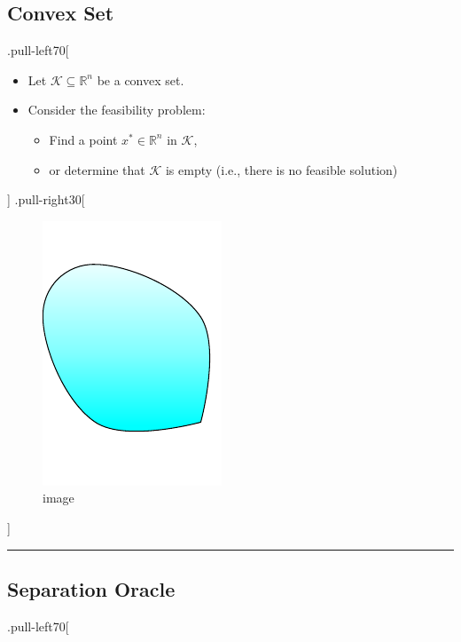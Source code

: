 \documentclass[
]{article}
\providecommand{\tightlist}{%
  \setlength{\itemsep}{0pt}\setlength{\parskip}{0pt}}
\begin{document}
\subsection{Convex Set}\label{convex-set}

.pull-left70{[}

\begin{itemize}
\tightlist
\item
  Let \(\mathcal{K} \subseteq \mathbb{R}^n\) be a convex set.
\item
  Consider the feasibility problem:

  \begin{itemize}
  \tightlist
  \item
    Find a point \(x^* \in \mathbb{R}^n\) in \(\mathcal{K}\),
  \item
    or determine that \(\mathcal{K}\) is empty (i.e., there is no
    feasible solution)
  \end{itemize}
\end{itemize}

{]} .pull-right30{[}

\begin{figure}
\centering
\includegraphics{ellipsoid.files/region.pdf}
\caption{image}
\end{figure}

{]}

\begin{center}\rule{0.5\linewidth}{0.5pt}\end{center}

\subsection{Separation Oracle}\label{separation-oracle}

.pull-left70{[}
\end{document}
